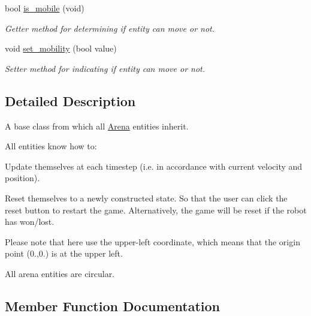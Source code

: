 \begin{DoxyCompactItemize}
\item 
bool \hyperlink{class_arena_entity_a9cfea21220c07502abd084afde49ae65}{is\+\_\+mobile} (void)\hypertarget{class_arena_entity_a9cfea21220c07502abd084afde49ae65}{}\label{class_arena_entity_a9cfea21220c07502abd084afde49ae65}

\begin{DoxyCompactList}\small\item\em Getter method for determining if entity can move or not. \end{DoxyCompactList}\item 
void \hyperlink{class_arena_entity_adb5d3089fec5c28cc989e5834fcdaf6c}{set\+\_\+mobility} (bool value)\hypertarget{class_arena_entity_adb5d3089fec5c28cc989e5834fcdaf6c}{}\label{class_arena_entity_adb5d3089fec5c28cc989e5834fcdaf6c}

\begin{DoxyCompactList}\small\item\em Setter method for indicating if entity can move or not. \end{DoxyCompactList}\end{DoxyCompactItemize}


\subsection{Detailed Description}
A base class from which all \hyperlink{class_arena}{Arena} entities inherit. 

All entities know how to\+:


\begin{DoxyEnumerate}
\item Update themselves at each timestep (i.\+e. in accordance with current velocity and position).
\item Reset themselves to a newly constructed state. So that the user can click the reset button to restart the game. Alternatively, the game will be reset if the robot has won/lost.
\end{DoxyEnumerate}

Please note that here use the upper-\/left coordinate, which means that the origin point (0.,0.) is at the upper left.

All arena entities are circular. 

\subsection{Member Function Documentation}

